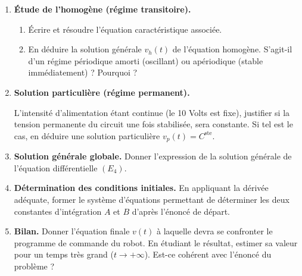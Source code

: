 \documentclass[a4paper,11pt]{article}
\begin{document}
\begin{enumerate}
    \item \textbf{Étude de l'homogène (régime transitoire).}
    \begin{enumerate}
        \item Écrire et résoudre l'équation caractéristique associée.
        \vspace{2.5cm}
        \item En déduire la solution générale $v_h(t)$ de l'équation homogène. S'agit-il d'un régime périodique amorti (oscillant) ou apériodique (stable immédiatement) ? Pourquoi ?
        \vspace{2cm}
    \end{enumerate}

    \vspace{0.5cm}

    \item \textbf{Solution particulière (régime permanent).}
    
    L'intensité d'alimentation étant continue (le 10 Volts est fixe), justifier si la tension permanente du circuit une fois stabilisée, sera constante.
    Si tel est le cas, en déduire une solution particulière $v_p(t) = C^{\text{ste}}$.
    
    \vspace{3.5cm}

    \item \textbf{Solution générale globale.}
    Donner l'expression de la solution générale de l'équation différentielle $(E_4)$.
    
    \vspace{2cm}

    \item \textbf{Détermination des conditions initiales.}
    En appliquant la dérivée adéquate, former le système d'équations permettant de déterminer les deux constantes d'intégration $A$ et $B$ d'après l'énoncé de départ.
    
    \vspace{6cm}
    
    \item \textbf{Bilan.}
    Donner l'équation finale $v(t)$ à laquelle devra se confronter le programme de commande du robot. En étudiant le résultat, estimer sa valeur pour un temps très grand ($t \to +\infty$). Est-ce cohérent avec l'énoncé du problème ?
    
\end{enumerate}

\newpage
\end{document}
